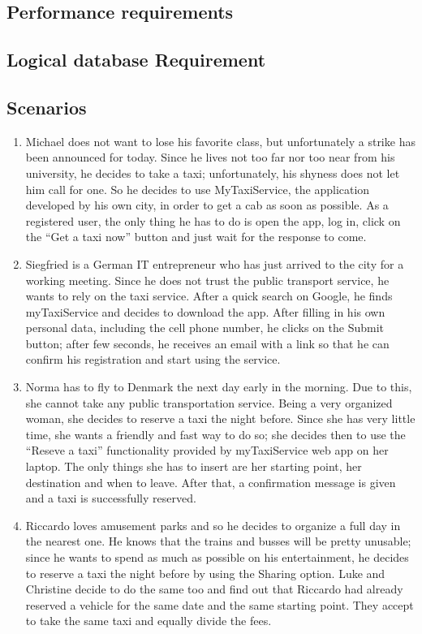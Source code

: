 \subsection{Performance requirements}
\subsection{Logical database Requirement}

\subsection{Scenarios}
\begin{enumerate}
\item Michael does not want to lose his favorite class, but unfortunately a strike has been announced for today. Since he lives not too far nor too near from his university, he decides to take a taxi; unfortunately, his shyness does not let him call for one. So he decides to use MyTaxiService, the application developed by his own city, in order to get a cab as soon as possible. As a registered user, the only thing he has to do is open the app, log in, click on the “Get a taxi now” button and just wait for the response to come.

\item Siegfried is a German IT entrepreneur who has just arrived to the city for a working meeting. Since he does not trust the public transport service, he wants to rely on the taxi service. After a quick search on Google, he finds myTaxiService and decides to download the app. After filling in his own personal data, including the cell phone number, he clicks on the Submit button; after few seconds, he receives an email with a link so that he can confirm his registration and start using the service. 

\item Norma has to fly to Denmark the next day early in the morning. Due to this, she cannot take any public transportation service. Being a very organized woman, she decides to reserve a taxi the night before. Since she has very little time, she wants a friendly and fast way to do so; she decides then to use the “Reseve a taxi” functionality provided by myTaxiService web app on her laptop. The only things she has to insert are her starting point, her destination and when to leave. After that, a confirmation message is given and a taxi is successfully reserved.

\item Riccardo loves amusement parks and so he decides to organize a full day in the nearest one. He knows that the trains and busses will be pretty unusable; since he wants to spend as much as possible on his entertainment, he decides to reserve a taxi the night before by using the Sharing option. Luke and Christine decide to do the same too and find out that Riccardo had already reserved a vehicle for the same date and the same starting point. They accept to take the same taxi and equally divide the fees.


\end{enumerate}
